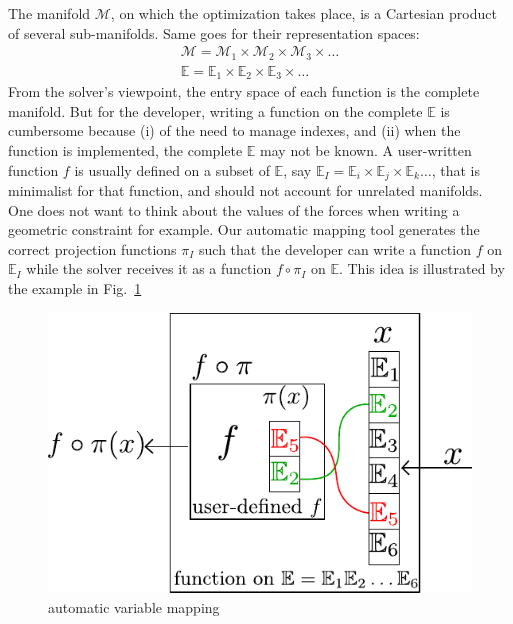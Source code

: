 The manifold $\mathcal{M}$, on which the optimization takes place, is a Cartesian product of several sub-manifolds. Same goes for their representation spaces:
\begin{equation}
  \begin{split}
    \mathcal{M} = \mathcal{M}_1\times\mathcal{M}_2\times\mathcal{M}_3\times\hdots\\
    \mathbb{E} = \mathbb{E}_1\times\mathbb{E}_2\times\mathbb{E}_3\times\hdots
  \end{split}
\end{equation}
From the solver's viewpoint, the entry space of each function is the complete manifold.
But for the developer, writing a function on the complete $\mathbb{E}$ is cumbersome because (i) of the need to manage indexes, and (ii) when the function is implemented, the complete $\mathbb{E}$ may not be known.
A user-written function $f$ is usually defined on a subset of $\mathbb{E}$, say $\mathbb{E}_I=\mathbb{E}_i\times\mathbb{E}_j\times\mathbb{E}_k\hdots$, that is minimalist for that function, and should not account for unrelated manifolds. One does not want to think about the values of the forces when writing a geometric constraint for example.
Our automatic mapping tool %
generates the correct projection functions $\pi_I$ such that the developer can write a function $f$ on $\mathbb{E}_I$ while the solver receives it as a function $f \circ \pi_I$ on $\mathbb{E}$. This idea is illustrated by the example in Fig.~\ref{fig:auto_map}

\begin{figure}[!htb]
\centering
  \centering
  \setlength\fboxsep{0pt}
  \includegraphics[width=.7\linewidth]{papers/Humanoids2015/figure/auto_mapping_text.pdf}
\caption{automatic variable mapping}
\label{fig:auto_map}
\end{figure}

